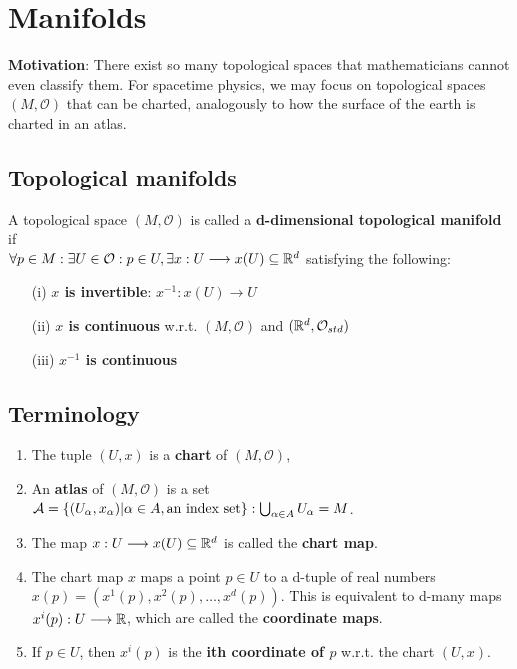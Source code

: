 \section{Manifolds}
\begin{framed}
\textbf{Motivation}: There exist so many topological spaces that mathematicians cannot even classify them. For spacetime physics, we may focus on topological spaces $(M, \mathcal{O})$ that can be charted, analogously to how the surface of the earth is charted in an atlas.
\end{framed}

\subsection{Topological manifolds}
\begin{definition}
  A topological space $(M, \mathcal{O})$ is called a \textbf{d-dimensional topological manifold} if \\
  $\forall p \in M : \exists U \in \mathcal{O} : p \in U, \exists x : U \longrightarrow x(U) \subseteq \mathbb{R}^d$ satisfying the following:
\begin{enumerate}
\item[(i)] \textbf{$x$ is invertible}: $x^{-1} : x(U) \to U$
\item[(ii)] \textbf{$x$ is continuous} w.r.t. $(M, \mathcal{O})$ and $(\mathbb{R}^d, \mathcal{O}_{std})$
\item[(iii)] \textbf{$x^{-1}$ is continuous}
\end{enumerate}
\end{definition}

\subsection{Terminology}
\begin{enumerate}
\item The tuple $(U , x)$ is a \textbf{chart} of $(M, \mathcal{O})$,
\item An \textbf{atlas} of $(M, \mathcal{O})$ is a set $\mathcal{A} = \lbrace (U_{\alpha}, x_{\alpha}) | \alpha \in A, \text{an index set} \rbrace : \bigcup_{\alpha \in A}U_{\alpha} = M$.
\item The map $x : U \longrightarrow x(U) \subseteq \mathbb{R}^d$ is called the \textbf{chart map}.
\item The chart map $x$ maps a point $ p \in U$ to a d-tuple of real numbers $x(p) = (x^1(p), x^2(p), \dots , x^d(p))$. This is equivalent to d-many maps $x^i(p): U \longrightarrow \mathbb{R}$, which are called the \textbf{coordinate maps}. 
\item If $p \in U$, then $x^i(p)$ is the \textbf{ith coordinate of $p$} w.r.t. the chart $(U, x)$.
\end{enumerate}

